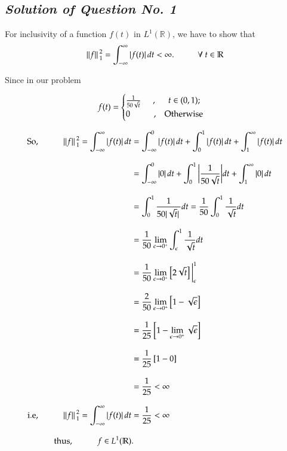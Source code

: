 \documentclass[12pt, a4paper]{article} %
\begin{document}
\BgThispage
\subsection{\slshape Solution of Question No. 1}

For inclusivity of a function $f(t)$ in $L^1(\mathbb{R})$, we have to show that 
\[\norm*{f}_1^2 = \int_{-\infty}^{\infty}\abs*{f(t)}dt < \infty.\hspace*{1cm} \forall\ t\in \mathbb{R}\]

Since in our problem 

\[f(t) = \begin{cases}
    \frac{1}{50\sqrt{t}}\hspace*{0.5cm},\hspace*{0.5cm} t\in (0,1) ; & \\
    0\hspace*{1cm},\hspace*{0.3cm} \mbox{Otherwise}
\end{cases}\]

\begin{equation*}
    \begin{split}
        \mbox{So}, \hspace*{1cm} \norm*{f}_1^2 = \int_{-\infty}^{\infty}\abs*{f(t)}dt & =  \int_{-\infty}^{0}\abs*{f(t)}dt + \int_{0}^{1}\abs*{f(t)}dt + \int_{1}^{\infty}\abs*{f(t)}dt\\[3mm]
        & = \int_{-\infty}^{0}\abs*{0}dt + \int_{0}^{1}\bigg|\frac{1}{50\sqrt{t}}\bigg|dt + \int_{1}^{\infty}\abs*{0}dt\\[3mm]
        & = \int_{0}^{1}\frac{1}{50\abs*{\sqrt{t}}}dt = \frac{1}{50}\int_{0}^{1}\frac{1}{\sqrt{t}}dt\\[3mm]
        & = \frac{1}{50}\lim_{\epsilon\to 0^+}\int_{\epsilon}^{1}\frac{1}{\sqrt{t}}dt\\[3mm]
        & = \frac{1}{50}\lim_{\epsilon\to 0^+}\left[2\sqrt{t}\right]\bigg|_{\epsilon} ^{1}\\[3mm]
        &  = \frac{2}{50}\lim_{\epsilon\to 0^+}\left[1-\sqrt{\epsilon}\right]\\[3mm]
        & = \frac{1}{25}\left[1-\lim_{\epsilon\to 0^+}\sqrt{\epsilon}\right]\\[3mm]
        & = \frac{1}{25}\left[1-0\right]\\[3mm]
        & = \frac{1}{25} < \infty\\[3mm]
        \mbox{i.e}, \hspace*{1cm} \norm*{f}_1^2 = \int_{-\infty}^{\infty}\abs*{f(t)}dt & = \frac{1}{25} < \infty \\[3mm]
        \mbox{thus}, \hspace*{1cm} f\in L^1(\mathbb{R}) &.
    \end{split}
\end{equation*}
\end{document}
